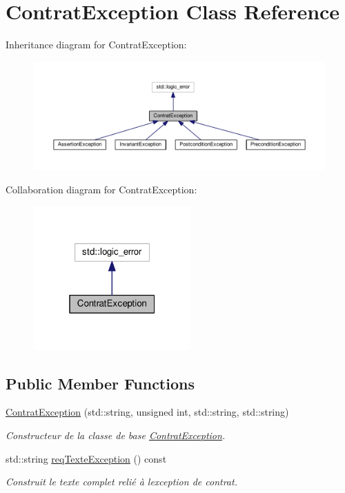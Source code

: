 \hypertarget{classContratException}{}\section{Contrat\+Exception Class Reference}
\label{classContratException}


Inheritance diagram for Contrat\+Exception\+:\nopagebreak
\begin{figure}[H]
\begin{center}
\leavevmode
\includegraphics[width=350pt]{classContratException__inherit__graph}
\end{center}
\end{figure}


Collaboration diagram for Contrat\+Exception\+:\nopagebreak
\begin{figure}[H]
\begin{center}
\leavevmode
\includegraphics[width=172pt]{classContratException__coll__graph}
\end{center}
\end{figure}
\subsection*{Public Member Functions}
\begin{DoxyCompactItemize}
\item 
\hyperlink{classContratException_ad6c04fb577e960f87e010b125aa636a0}{Contrat\+Exception} (std\+::string, unsigned int, std\+::string, std\+::string)
\begin{DoxyCompactList}\small\item\em Constructeur de la classe de base \hyperlink{classContratException}{Contrat\+Exception}. \end{DoxyCompactList}\item 
std\+::string \hyperlink{classContratException_a8d20a9959f3b7cc4334165794dbaf1fc}{req\+Texte\+Exception} () const 
\begin{DoxyCompactList}\small\item\em Construit le texte complet relié à l\textquotesingle{}exception de contrat. \end{DoxyCompactList}\end{DoxyCompactItemize}


